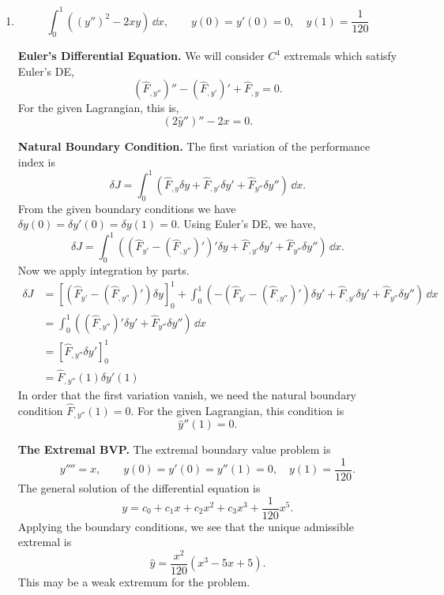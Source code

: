 \begin{Solution}
  \begin{enumerate}
  \item
    \[
    \int_0^1 \left( (y'')^2 - 2 x y \right)\,\dd x, \qquad
    y(0) = y'(0) = 0, \quad
    y(1) = \frac{1}{120}
    \]


    \textbf{Euler's Differential Equation.}
    We will consider $C^4$ extremals which satisfy Euler's DE,
    \[
    (\hat{F}_{,y''})'' - (\hat{F}_{,y'})' + \hat{F}_{,y} = 0.
    \]
    For the given Lagrangian, this is,
    \[
    (2 \hat{y}'')'' - 2 x = 0.
    \]

    \textbf{Natural Boundary Condition.}
    The first variation of the performance index is
    \[
    \delta J = \int_0^1 ( \hat{F}_{,y} \delta y + \hat{F}_{,y'} \delta y'
    + \hat{F}_{y''} \delta y'' ) \,\dd x.
    \]
    From the given boundary conditions we have $\delta y(0) = \delta y'(0)
    = \delta y(1) = 0$.
    Using Euler's DE, we have,
    \[
    \delta J = \int_0^1 ( (\hat{F}_{y'} - (\hat{F}_{,y''})' )' \delta y 
    + \hat{F}_{,y'} \delta y'
    + \hat{F}_{y''} \delta y'' ) \,\dd x.
    \]
    Now we apply integration by parts.
    \begin{align*}
      \delta J 
      &= \left[ (\hat{F}_{y'} - (\hat{F}_{,y''})' ) \delta y \right]_0^1
      + \int_0^1 ( - (\hat{F}_{y'} - (\hat{F}_{,y''})' ) \delta y' 
      + \hat{F}_{,y'} \delta y'
      + \hat{F}_{y''} \delta y'' ) \,\dd x \\
      &= \int_0^1 ( (\hat{F}_{,y''})'  \delta y' 
      + \hat{F}_{y''} \delta y'' ) \,\dd x \\
      &= \left[ \hat{F}_{,y''}  \delta y' \right]_0^1 \\
      &= \hat{F}_{,y''}(1) \delta y'(1)
    \end{align*}
    In order that the first variation vanish, we need the natural boundary 
    condition $\hat{F}_{,y''}(1) = 0$.  For the given Lagrangian, this 
    condition is
    \[
    \hat{y}''(1) = 0.
    \]


    \textbf{The Extremal BVP.}
    The extremal boundary value problem is
    \[
    y'''' = x, \qquad
    y(0) = y'(0) = y''(1) = 0, \quad y(1) = \frac{1}{120}.
    \]
    The general solution of the differential equation is
    \[
    y = c_0 + c_1 x + c_2 x^2 + c_3 x^3 + \frac{1}{120} x^5.
    \]
    Applying the boundary conditions, we see that the unique admissible extremal
    is
    \[
    \hat{y} = \frac{x^2}{120} ( x^3 - 5 x + 5 ).
    \]
    This may be a weak extremum for the problem.



\end{enumerate}
\end{Solution}
